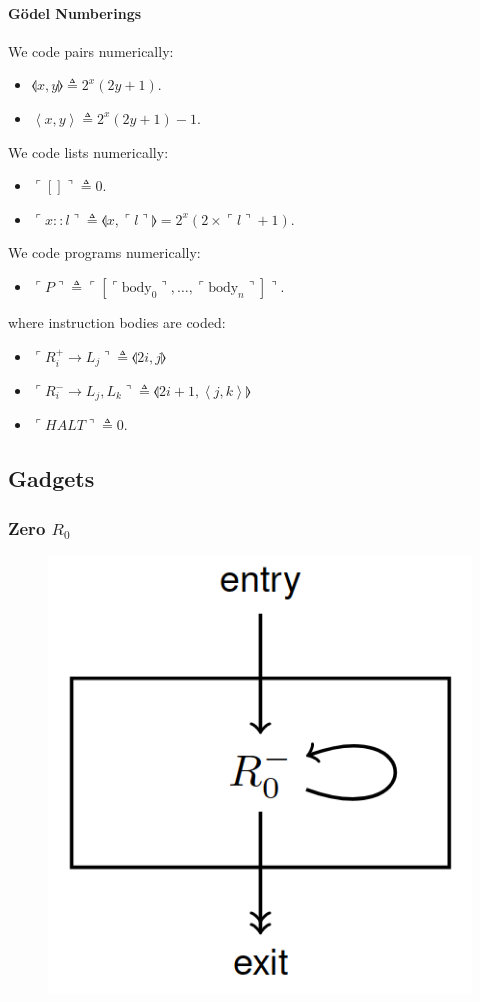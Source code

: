 \documentclass[twocolumn,english]{article}
\begin{document}
\paragraph{G\"{o}del Numberings}

We code pairs numerically:
\begin{itemize}
\item $\llangle x,y\rrangle\triangleq2^{x}\left(2y+1\right)$.
\item $\left\langle x,y\right\rangle \triangleq2^{x}\left(2y+1\right)-1$.
\end{itemize}
We code lists numerically:
\begin{itemize}
\item $\ulcorner[]\urcorner\triangleq0$.
\item $\ulcorner x::l\urcorner\triangleq\llangle x,\ulcorner l\urcorner\rrangle=2^{x}\left(2\times\ulcorner l\urcorner+1\right)$.
\end{itemize}
We code programs numerically:
\begin{itemize}
\item $\ulcorner P\urcorner\triangleq\ulcorner\left[\ulcorner\text{body}_{0}\urcorner,\dots,\ulcorner\text{body}_{n}\urcorner\right]\urcorner$.
\end{itemize}
where instruction bodies are coded:
\begin{itemize}
\item $\ulcorner R_{i}^{+}\rightarrow L_{j}\urcorner\triangleq\llangle2i,j\rrangle$
\item $\ulcorner R_{i}^{-}\rightarrow L_{j},L_{k}\urcorner\triangleq\llangle2i+1,\left\langle j,k\right\rangle \rrangle$
\item $\ulcorner HALT\urcorner\triangleq0$.
\end{itemize}

\subsection{Gadgets}

\subsubsection*{Zero $R_{0}$}

\begin{figure}[H]
\centering{}\includegraphics[width=0.3\columnwidth]{img/zero}
\end{figure}
\end{document}
